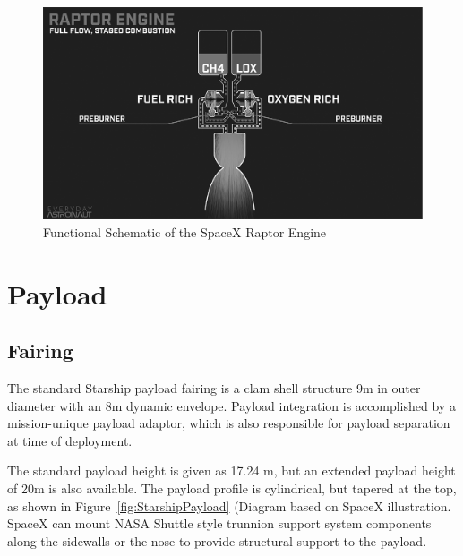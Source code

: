\documentclass[11pt]{article}
\begin{document}
\begin{figure}[H]
    \centering
    \includegraphics{assets/RaptorSchematic.png}
    \caption{Functional Schematic of the SpaceX Raptor Engine}
    \label{fig:RaptorSchematic}
\end{figure}


\section{Payload}
\subsection{Fairing}

The standard Starship payload fairing is a clam shell structure 9m in outer diameter with an 8m dynamic envelope. Payload integration is accomplished by a mission-unique payload adaptor, which is also responsible for payload separation at time of deployment.\cite{spacex01}

The standard payload height is given as 17.24 m, but an extended payload height of 20m is also available. The payload profile is cylindrical, but tapered at the top, as shown in Figure~\ref{fig:StarshipPayload} (Diagram based on SpaceX illustration. SpaceX can mount NASA Shuttle style trunnion support system components along the sidewalls or the nose to provide structural support to the payload.\cite{spacex01} 
\end{document}
